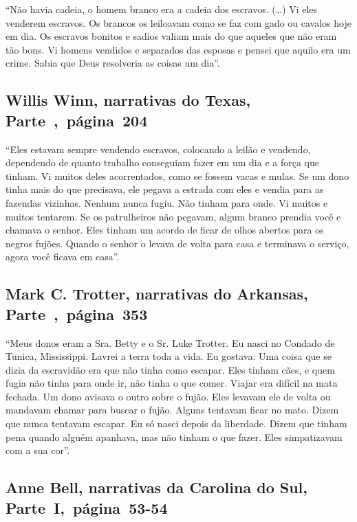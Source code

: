 ``Não havia cadeia, o homem branco era a cadeia dos escravos. (\ldots{})
Vi eles venderem escravos. Os brancos os leiloavam como se faz com gado
ou cavalos hoje em dia. Os escravos bonitos e sadios valiam mais do que
aqueles que não eram tão bons. Vi homens vendidos e separados das
esposas e pensei que aquilo era um crime. Sabia que Deus resolveria as
coisas um dia''.

\subsection{Willis Winn, narrativas do Texas, Parte~,~página~204}
\label{ref304}

``Eles estavam sempre vendendo escravos, colocando a leilão e vendendo,
dependendo de quanto trabalho conseguiam fazer em um dia e a força que
tinham. Vi muitos deles acorrentados, como se fossem vacas e mulas. Se
um dono tinha mais do que precisava, ele pegava a estrada com eles e
vendia para as fazendas vizinhas. Nenhum nunca fugiu. Não tinham para
onde. Vi muitos e muitos tentarem. Se os patrulheiros não pegavam, algum
branco prendia você e chamava o senhor. Eles tinham um acordo de ficar
de olhos abertos para os negros fujões. Quando o senhor o levava de
volta para casa e terminava o serviço, agora você ficava em casa''.

\subsection{Mark C. Trotter, narrativas do Arkansas, Parte~,~página~353}
\label{ref264}

``Meus donos eram a Sra. Betty e o Sr. Luke Trotter. Eu nasci no Condado
de Tunica, Mississippi. Lavrei a terra toda a vida. Eu gostava. Uma
coisa que se dizia da escravidão era que não tinha como escapar. Eles
tinham cães, e quem fugia não tinha para onde ir, não tinha o que comer.
Viajar era difícil na mata fechada. Um dono avisava o outro sobre o
fujão. Eles levavam ele de volta ou mandavam chamar para buscar o fujão.
Alguns tentavam ficar no mato. Dizem que nunca tentavam escapar. Eu só
nasci depois da liberdade. Dizem que tinham pena quando alguém apanhava,
mas não tinham o que fazer. Eles simpatizavam com a sua cor''.

\subsection{Anne Bell, narrativas da Carolina do Sul, Parte~I,~página~53-54} \label{ref22}

